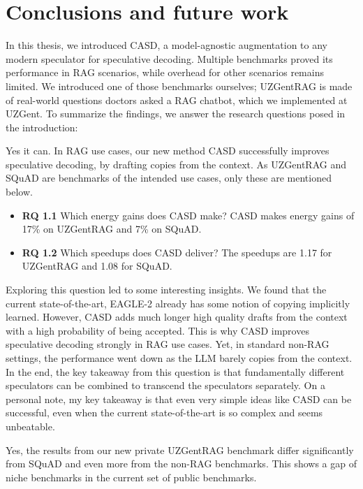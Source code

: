 
\chapter{Conclusions and future work}
\label{sec:conclusion_future_work}

In this thesis, we introduced CASD, a model-agnostic augmentation to any modern speculator for speculative decoding. Multiple benchmarks proved its performance in RAG scenarios, while overhead for other scenarios remains limited. We introduced one of those benchmarks ourselves; UZGentRAG is made of real-world questions doctors asked a RAG chatbot, which we implemented at UZGent. To summarize the findings, we answer the research questions posed in the introduction:

\begin{tcolorbox}[colback=blue-ish-light,colframe=blue-ish,title=\textbf{RQ1:} Could context improve speculative decoding?, coltitle=white]
    Yes it can. In RAG use cases, our new method CASD successfully improves speculative decoding, by drafting copies from the context. As UZGentRAG and SQuAD are benchmarks of the intended use cases, only these are mentioned below.
    \begin{itemize}
        \item \textbf{RQ 1.1} Which energy gains does CASD make? CASD makes energy gains of 17\% on UZGentRAG and 7\% on SQuAD.
        \item \textbf{RQ 1.2} Which speedups does CASD deliver? The speedups are 1.17 for UZGentRAG and 1.08 for SQuAD.
    \end{itemize}
\end{tcolorbox}

Exploring this question led to some interesting insights. We found that the current state-of-the-art, EAGLE-2 already has some notion of copying implicitly learned. However, CASD adds much longer high quality drafts from the context with a high probability of being accepted. This is why CASD improves speculative decoding strongly in RAG use cases. Yet, in standard non-RAG settings, the performance went down as the LLM barely copies from the context. In the end, the key takeaway from this question is that fundamentally different speculators can be combined to transcend the speculators separately. On a personal note, my key takeaway is that even very simple ideas like CASD can be successful, even when the current state-of-the-art is so complex and seems unbeatable. 

\begin{tcolorbox}[colback=blue-ish-light,colframe=blue-ish,title=\textbf{RQ2:} Does a real-world benchmark in a niche domain show significantly different results from existing speculative decoding benchmarks?, coltitle=white]
    Yes, the results from our new private UZGentRAG benchmark differ significantly from SQuAD and even more from the non-RAG benchmarks. This shows a gap of niche benchmarks in the current set of public benchmarks.
\end{tcolorbox}

